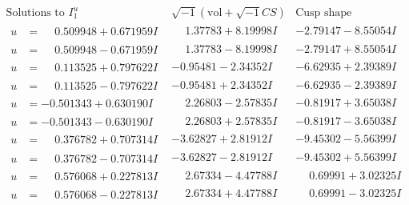 \documentclass[1p]{elsarticle_modified}
\theoremstyle{definition}
\newcommand{\I}{\sqrt{-1}}
\begin{document}
$$\begin{array}{c|c|c}  
\text{Solutions to }I^u_{1}& \I (\text{vol} + \sqrt{-1}CS) & \text{Cusp shape}\\
 \hline 
\begin{aligned}
u &= \phantom{-}0.509948 + 0.671959 I\end{aligned}
 & \phantom{-}1.37783 + 8.19998 I & -2.79147 - 8.55054 I \\ \hline\begin{aligned}
u &= \phantom{-}0.509948 - 0.671959 I\end{aligned}
 & \phantom{-}1.37783 - 8.19998 I & -2.79147 + 8.55054 I \\ \hline\begin{aligned}
u &= \phantom{-}0.113525 + 0.797622 I\end{aligned}
 & -0.95481 - 2.34352 I & -6.62935 + 2.39389 I \\ \hline\begin{aligned}
u &= \phantom{-}0.113525 - 0.797622 I\end{aligned}
 & -0.95481 + 2.34352 I & -6.62935 - 2.39389 I \\ \hline\begin{aligned}
u &= -0.501343 + 0.630190 I\end{aligned}
 & \phantom{-}2.26803 - 2.57835 I & -0.81917 + 3.65038 I \\ \hline\begin{aligned}
u &= -0.501343 - 0.630190 I\end{aligned}
 & \phantom{-}2.26803 + 2.57835 I & -0.81917 - 3.65038 I \\ \hline\begin{aligned}
u &= \phantom{-}0.376782 + 0.707314 I\end{aligned}
 & -3.62827 + 2.81912 I & -9.45302 - 5.56399 I \\ \hline\begin{aligned}
u &= \phantom{-}0.376782 - 0.707314 I\end{aligned}
 & -3.62827 - 2.81912 I & -9.45302 + 5.56399 I \\ \hline\begin{aligned}
u &= \phantom{-}0.576068 + 0.227813 I\end{aligned}
 & \phantom{-}2.67334 - 4.47788 I & \phantom{-}0.69991 + 3.02325 I \\ \hline\begin{aligned}
u &= \phantom{-}0.576068 - 0.227813 I\end{aligned}
 & \phantom{-}2.67334 + 4.47788 I & \phantom{-}0.69991 - 3.02325 I \\ \hline\begin{aligned}

\end{aligned}
\end{array}$$
\end{document}
